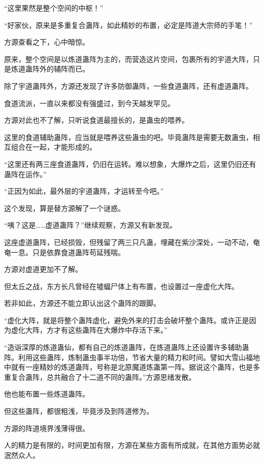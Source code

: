 \begin{this_body}
“这里果然是整个空间的中枢！”

“好家伙，原来是多重复合蛊阵，如此精妙的布置，必定是阵道大宗师的手笔！”

方源查看之下，心中暗惊。

原来，整个空间是以炼道蛊阵为主的，而营造这片空间，包裹所有的宇道大阵，只是炼道蛊阵外的辅阵而已。

除了宇道蛊阵外，方源还发现了许多防御蛊阵，一些食道蛊阵，还有虚道蛊阵。

食道流派，一直以来都没有强盛过，到今天越发罕见。

方源对此也不了解，只听说食道最擅长的，是蛊虫的喂养。

这里的食道辅助蛊阵，应当就是喂养这些蛊虫的吧。毕竟蛊阵是需要无数蛊虫，相互组合在一起，才能形成的。

“这里还有两三座食道蛊阵，仍旧在运转。难以想象，大爆炸之后，这里仍旧还有蛊阵在运作。”

“正因为如此，最外层的宇道蛊阵，才运转至今吧。”

这个发现，算是替方源解了一个谜惑。

“咦？这是……虚道蛊阵？”继续观察，方源又有新发现。

这座虚道蛊阵，已经损毁，但残留了两三只凡蛊，埋藏在紫沙深处，一动不动，奄奄一息。只是依靠食道蛊阵苟延残喘。

方源对虚道更加不了解。

但太丘之战，东方长凡曾经在墟蝠尸体上有布置，也设置过一座虚化大阵。

若非如此，方源还不能立即认出这个蛊阵的跟脚。

“虚化大阵，就是将整个蛊阵虚化，避免外来的打击会破坏整个蛊阵。或许正是因为虚化大阵，方才有这些蛊阵在大爆炸中存活下来。”

“造诣深厚的炼道蛊仙，都有自己的炼道蛊阵，在炼道蛊阵上还设置许多辅助蛊阵。利用这些蛊阵，炼制蛊虫事半功倍，节省大量的精力和时间。譬如大雪山福地中就有一座精妙的炼道蛊阵，号称是北原魔道炼蛊第一阵。据说这个蛊阵，也是多重复合蛊阵，总共融合了十二道不同的蛊阵。”方源思绪发散。

他也能布置一些炼道蛊阵。

但这些蛊阵，都很粗浅，毕竟涉及到阵道修为。

方源的阵道境界浅薄得很。

人的精力是有限的，时间更加有限，方源在某些方面有所成就，在其他方面势必就泯然众人。

\end{this_body}

